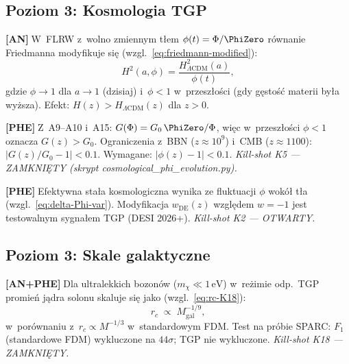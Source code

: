 \subsection{Poziom 3: Kosmologia TGP}%
\label{app:H-cosmo}

\begin{chain}\label{chain:A15}
  \textbf{[AN]}$\;$W~FLRW z~wolno zmiennym t\l{}em $\phi(t) = \Phi/\PhiZero$
  r\'ownanie Friedmanna modyfikuje si\k{e} (wzgl.~\eqref{eq:friedmann-modified}):
  \begin{equation}\label{eq:H-Friedmann}
    H^2(a,\phi) = \frac{H^2_{\Lambda\mathrm{CDM}}(a)}{\phi(t)},
  \end{equation}
  gdzie $\phi \to 1$ dla $a \to 1$ (dzisiaj) i~$\phi < 1$ w~przesz\l{}o\'sci
  (gdy g\k{e}sto\'s\'c materii by\l{}a wy\.zsza).
  Efekt: $H(z) > H_{\Lambda\mathrm{CDM}}(z)$ dla $z > 0$.
\end{chain}

\begin{chain}\label{chain:A16}
  \textbf{[PHE]}$\;$Z~A9--A10 i~A15: $G(\Phi) = G_0\,\PhiZero/\Phi$,
  wi\k{e}c w~przesz\l{}o\'sci $\phi < 1$ oznacza $G(z) > G_0$.
  Ograniczenia z~BBN ($z \approx 10^9$) i~CMB ($z \approx 1100$):
  $|G(z)/G_0 - 1| < 0.1$.
  Wymagane: $|\phi(z)-1| < 0.1$.
  \emph{Kill-shot K5 --- ZAMKNI\k{E}TY (skrypt cosmological\_phi\_evolution.py).}
\end{chain}

\begin{chain}\label{chain:A17}
  \textbf{[PHE]}$\;$Efektywna sta\l{}a kosmologiczna wynika
  ze fluktuacji $\phi$ wok\'o\l{} t\l{}a (wzgl.~\eqref{eq:delta-Phi-var}).
  Modyfikacja $w_{\mathrm{DE}}(z)$ wzgl\k{e}dem $w=-1$
  jest testowalnym sygna\l{}em TGP (DESI 2026+).
  \emph{Kill-shot K2 --- OTWARTY.}
\end{chain}

\subsection{Poziom 3: Skale galaktyczne}%
\label{app:H-galaktyki}

\begin{chain}\label{chain:A18}
  \textbf{[AN+PHE]}$\;$Dla ultralekkich bozon\'ow ($m_\chi \ll 1\,\mathrm{eV}$)
  w~re\.zimie odp.~TGP promie\'n j\k{a}dra solonu skaluje si\k{e} jako
  (wzgl.~\eqref{eq:rc-K18}):
  \begin{equation}\label{eq:H-rc}
    r_c \;\propto\; M_{\mathrm{gal}}^{-1/9},
  \end{equation}
  w~por\'ownaniu z~$r_c \propto M^{-1/3}$ w~standardowym FDM.
  Test na pr\'obie SPARC: $F_1$\,(standardowe FDM) wykluczone
  na $44\sigma$; TGP nie wykluczone.
  \emph{Kill-shot K18 --- ZAMKNI\k{E}TY.}
\end{chain}

